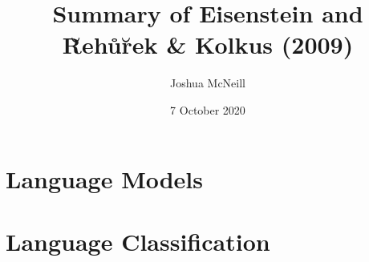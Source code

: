 \documentclass{beamer}
\author{Joshua McNeill}
\title{Summary of Eisenstein and R̆ehůr̆ek \& Kolkus (2009)}
\date{7 October 2020}
\begin{document}
  \begin{frame}
    \titlepage
  \end{frame}

  \begin{frame}
    \tableofcontents[hideallsubsections]
  \end{frame}


  \section{Language Models}
    \begin{frame}

    \end{frame}

  \section{Language Classification}
\end{document}
